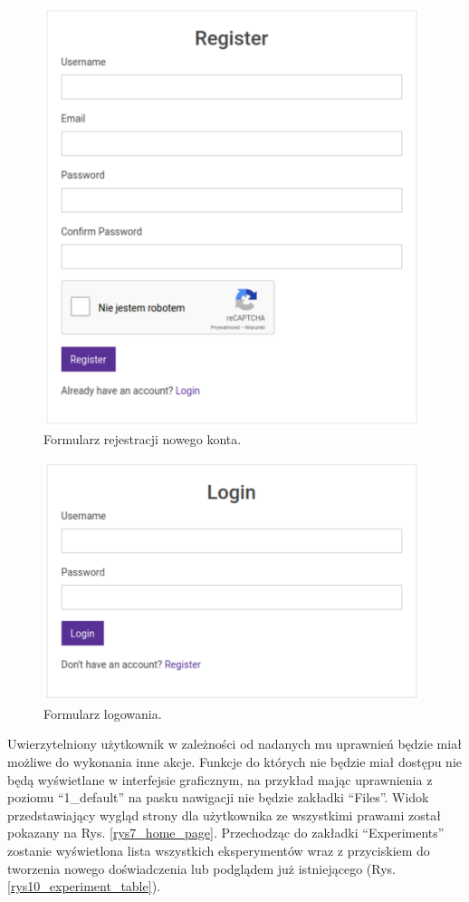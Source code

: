 \begin{figure}[htb]
	\centering
	\includegraphics[width=11cm]{grafika/registery_form.eps}
	\caption{Formularz rejestracji nowego konta.}
	\label{rys8_registery_form}
\end{figure}

\begin{figure}[htb]
	\centering
	\includegraphics[width=11cm]{grafika/login_form.eps}
	\caption{Formularz logowania.}
	\label{rys9_login_form}
\end{figure}

Uwierzytelniony użytkownik w zależności od nadanych mu uprawnień będzie miał możliwe do wykonania inne akcje. 
Funkcje do których nie będzie miał dostępu nie będą wyświetlane w interfejsie graficznym, na przykład mając uprawnienia z poziomu \enquote{1\_default} na pasku nawigacji nie będzie zakładki \enquote{Files}. Widok przedstawiający wygląd strony dla użytkownika ze wszystkimi prawami został pokazany na Rys. \ref{rys7_home_page}. Przechodząc do zakładki \enquote{Experiments} zostanie wyświetlona lista wszystkich eksperymentów wraz z przyciskiem do tworzenia nowego doświadczenia lub podglądem już istniejącego (Rys. \ref{rys10_experiment_table}). 

